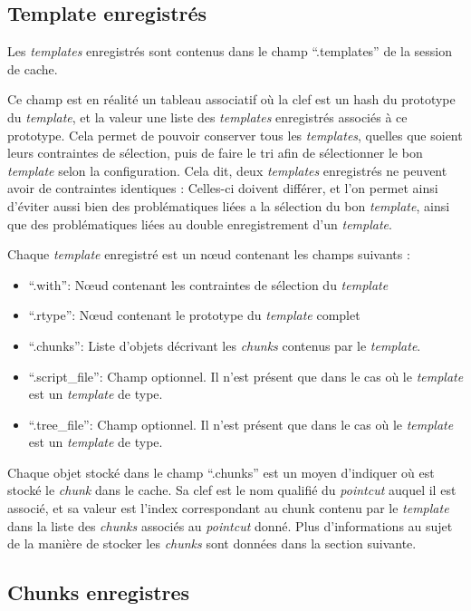 \documentclass[french]{rtxreport}
\begin{document}
\subsection{Template enregistrés}

Les \emph{templates} enregistrés sont contenus dans le champ ``.templates'' de
la session de cache.

Ce champ est en réalité un tableau associatif où la clef est un hash du
prototype du \emph{template}, et la valeur une liste des \emph{templates}
enregistrés associés à ce prototype. Cela permet de pouvoir conserver tous les
\emph{templates}, quelles que soient leurs contraintes de sélection, puis de
faire le tri afin de sélectionner le bon \emph{template} selon la
configuration. Cela dit, deux \emph{templates} enregistrés ne peuvent avoir de
contraintes identiques : Celles-ci doivent différer, et l'on permet ainsi
d'éviter aussi bien des problématiques liées a la sélection du bon
\emph{template}, ainsi que des problématiques liées au double enregistrement
d'un \emph{template}.

Chaque \emph{template} enregistré est un nœud contenant les champs suivants :
\begin{itemize}
    \item ``.with'': Nœud contenant les contraintes de sélection du
        \emph{template}
    \item ``.rtype'': Nœud contenant le prototype du \emph{template} complet
    \item ``.chunks'': Liste d'objets décrivant les \emph{chunks} contenus par
        le \emph{template}.
    \item ``.script\_file'': Champ optionnel. Il n'est présent que dans le cas
        où le \emph{template} est un \emph{template} de type.
    \item ``.tree\_file'': Champ optionnel. Il n'est présent que dans le cas
        où le \emph{template} est un \emph{template} de type.
\end{itemize}

Chaque objet stocké dans le champ ``.chunks'' est un moyen d'indiquer où est
stocké le \emph{chunk} dans le cache. Sa clef est le nom qualifié du
\emph{pointcut} auquel il est associé, et sa valeur est l'index correspondant
au chunk contenu par le \emph{template} dans la liste des \emph{chunks}
associés au \emph{pointcut} donné. Plus d'informations au sujet de la manière
de stocker les \emph{chunks} sont données dans la section suivante.


\subsection{Chunks enregistres}
\end{document}
